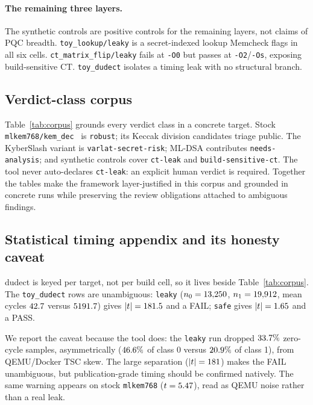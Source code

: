 \paragraph{The remaining three layers.}
The synthetic controls are positive controls for the remaining layers, not claims
of PQC breadth. \texttt{toy\_lookup/leaky} is a secret-indexed lookup Memcheck
flags in all six cells. \texttt{ct\_matrix\_flip/leaky} fails at \texttt{-O0} but
passes at \texttt{-O2}/\texttt{-Os}, exposing build-sensitive CT.
\texttt{toy\_dudect} isolates a timing leak with no structural branch.

\subsection{Verdict-class corpus}
\label{sec:results-corpus}

Table~\ref{tab:corpus} grounds every verdict class in a concrete target. Stock
\texttt{mlkem768/kem\_dec}~\cite{pqclean,fips203,kyber} is \texttt{robust}; its
Keccak division candidates triage public. The KyberSlash variant is
\texttt{varlat-secret-risk}; ML-DSA contributes \texttt{needs-analysis}; and
synthetic controls cover \texttt{ct-leak} and \texttt{build-sensitive-ct}. The
tool never auto-declares \texttt{ct-leak}: an explicit human verdict is required.
Together the tables make the framework layer-justified in this corpus and
grounded in concrete runs while preserving the review obligations attached to
ambiguous findings.

\subsection{Statistical timing appendix and its honesty caveat}
\label{sec:results-dudect}

dudect is keyed per target, not per build cell, so it lives beside
Table~\ref{tab:corpus}. The \texttt{toy\_dudect}
rows are unambiguous: \texttt{leaky} ($n_0=13{,}250$,
$n_1=19{,}912$, mean cycles $42.7$ versus
$5191.7$) gives $|t|=181.5$ and a FAIL; \texttt{safe}
gives $|t|=1.65$ and a PASS.

We report the caveat because the tool does: the \texttt{leaky} run dropped
$33.7\%$ zero-cycle samples, asymmetrically
($46.6\%$ of class 0 versus $20.9\%$ of class 1), from
QEMU/Docker TSC skew. The large separation ($|t|=181$) makes the
FAIL unambiguous, but publication-grade timing should be confirmed natively. The
same warning appears on stock \texttt{mlkem768} ($t=5.47$), read as QEMU
noise rather than a real leak.
